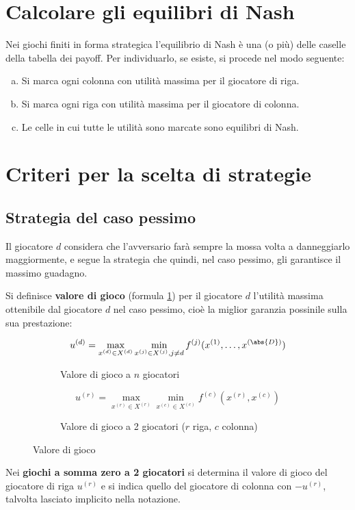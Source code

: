 \documentclass[\main/main.tex]{subfiles}
\begin{document}
\clearpage

\section{Calcolare gli equilibri di Nash}
Nei giochi finiti in forma strategica l'equilibrio di Nash è una (o più) delle caselle della tabella dei payoff. Per individuarlo, se esiste, si procede nel modo seguente:

\begin{enumerate}[a)]
	\item Si marca ogni colonna con utilità massima per il giocatore di riga.
	\item Si marca ogni riga con utilità massima per il giocatore di colonna.
	\item Le celle in cui tutte le utilità sono marcate sono equilibri di Nash.
\end{enumerate}

\section{Criteri per la scelta di strategie}
\subsection{Strategia del caso pessimo}
Il giocatore $d$ considera che l'avversario farà sempre la mossa volta a danneggiarlo maggiormente, e segue la strategia che quindi, nel caso pessimo, gli garantisce il massimo guadagno.

\begin{definition}
	Si definisce \textbf{valore di gioco} (formula \ref{valore_gioco}) per il giocatore $d$ l'utilità massima ottenibile dal giocatore $d$ nel caso pessimo, cioè la miglior garanzia possinile sulla sua prestazione:
	\begin{figure}
		\begin{subfigure}{0.49\textwidth}
			\[
				u^{(d)} = \max_{x^{(d)} \in X^{(d)}} \min_{x^{(j)} \in X^{(j)}, j\neq d} f^{(j)} (x^{(1)}, \ldots, x^{(\abs{D})})
			\]
			\caption{Valore di gioco a $n$ giocatori}
		\end{subfigure}
		\begin{subfigure}{0.49\textwidth}
			\[
				u^{(r)} = \max_{x^{(r)} \in X^{(r)}} \min_{x^{(c)} \in X^{(c)}} f^{(c)} (x^{(r)}, x^{(c)})
			\]
			\caption{Valore di gioco a 2 giocatori ($r$ riga, $c$ colonna)}
		\end{subfigure}
		\caption{Valore di gioco}
		\label{valore_gioco}
	\end{figure}

	Nei \textbf{giochi a somma zero a 2 giocatori} si determina il valore di gioco del giocatore di riga $u^{(r)}$ e si indica quello del giocatore di colonna con $-u^{(r)}$, talvolta lasciato implicito nella notazione.
\end{definition}
\end{document}
